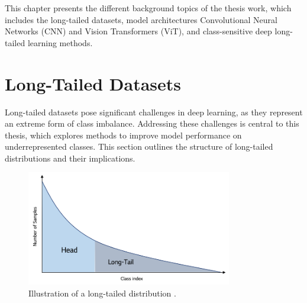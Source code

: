 
This chapter presents the different background topics of the thesis work, which includes the long-tailed datasets, model architectures Convolutional Neural Networks (CNN) and Vision Transformers (ViT), and class-sensitive deep long-tailed learning methods.


\section{Long-Tailed Datasets}
\label{sec:lt-datasets}
Long-tailed datasets pose significant challenges in deep learning, as they represent an extreme form of class imbalance. Addressing these challenges is central to this thesis, which explores methods to improve model performance on underrepresented classes. This section outlines the structure of long-tailed distributions and their implications.

\begin{figure}[ht]
    \centering
    \includegraphics[width=0.8\textwidth]{Images/long_tail_distribution.png} 
    \caption{Illustration of a long-tailed distribution \cite{lgresearch257}. }
    \label{fig:lt_distribution} 
\end{figure}

